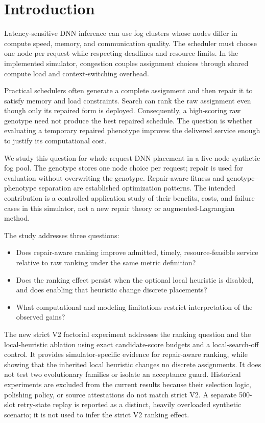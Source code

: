 \documentclass[pdflatex,sn-mathphys-num]{sn-jnl}
\begin{document}
\section{Introduction}

Latency-sensitive DNN inference can use fog clusters whose nodes differ in compute speed, memory, and communication quality. The scheduler must choose one node per request while respecting deadlines and resource limits. In the implemented simulator, congestion couples assignment choices through shared compute load and context-switching overhead.

Practical schedulers often generate a complete assignment and then repair it to satisfy memory and load constraints. Search can rank the raw assignment even though only its repaired form is deployed. Consequently, a high-scoring raw genotype need not produce the best repaired schedule. The question is whether evaluating a temporary repaired phenotype improves the delivered service enough to justify its computational cost.

We study this question for whole-request DNN placement in a five-node synthetic fog pool. The genotype stores one node choice per request; repair is used for evaluation without overwriting the genotype. Repair-aware fitness and genotype--phenotype separation are established optimization patterns. The intended contribution is a controlled application study of their benefits, costs, and failure cases in this simulator, not a new repair theory or augmented-Lagrangian method.

The study addresses three questions:
\begin{itemize}
\item Does repair-aware ranking improve admitted, timely, resource-feasible service relative to raw ranking under the same metric definition?
\item Does the ranking effect persist when the optional local heuristic is disabled, and does enabling that heuristic change discrete placements?
\item What computational and modeling limitations restrict interpretation of the observed gains?
\end{itemize}
The new strict V2 factorial experiment addresses the ranking question and the local-heuristic ablation using exact candidate-score budgets and a local-search-off control. It provides simulator-specific evidence for repair-aware ranking, while showing that the inherited local heuristic changes no discrete assignments. It does not test two evolutionary families or isolate an acceptance guard. Historical experiments are excluded from the current results because their selection logic, polishing policy, or source attestations do not match strict V2. A separate 500-slot retry-state replay is reported as a distinct, heavily overloaded synthetic scenario; it is not used to infer the strict V2 ranking effect.
\end{document}

